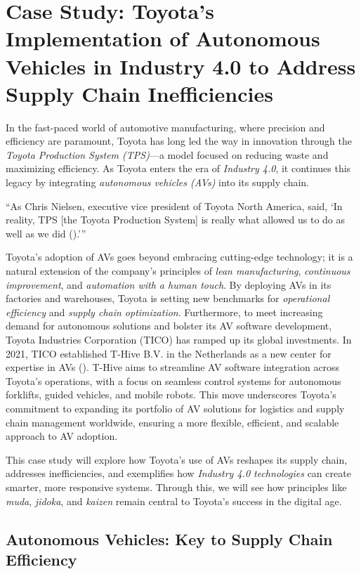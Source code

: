 \section{Case Study: Toyota’s Implementation of Autonomous Vehicles in Industry 4.0 to Address Supply Chain Inefficiencies}

In the fast-paced world of automotive manufacturing, where precision and efficiency are paramount, Toyota has long led the way in innovation through the \textit{Toyota Production System (TPS)}—a model focused on reducing waste and maximizing efficiency. As Toyota enters the era of \textit{Industry 4.0}, it continues this legacy by integrating \textit{autonomous vehicles (AVs)} into its supply chain. 

“As Chris Nielsen, executive vice president of Toyota North America, said, ‘In reality, TPS [the Toyota Production System] is really what allowed us to do as well as we did (\cite{Shih_2022}).’”

Toyota’s adoption of AVs goes beyond embracing cutting-edge technology; it is a natural extension of the company’s principles of \textit{lean manufacturing}, \textit{continuous improvement}, and \textit{automation with a human touch}. By deploying AVs in its factories and warehouses, Toyota is setting new benchmarks for \textit{operational efficiency} and \textit{supply chain optimization}. Furthermore, to meet increasing demand for autonomous solutions and bolster its AV software development, Toyota Industries Corporation (TICO) has ramped up its global investments. In 2021, TICO established T-Hive B.V. in the Netherlands as a new center for expertise in AVs (\cite{toyota_2021}). T-Hive aims to streamline AV software integration across Toyota’s operations, with a focus on seamless control systems for autonomous forklifts, guided vehicles, and mobile robots. This move underscores Toyota’s commitment to expanding its portfolio of AV solutions for logistics and supply chain management worldwide, ensuring a more flexible, efficient, and scalable approach to AV adoption.

This case study will explore how Toyota’s use of AVs reshapes its supply chain, addresses inefficiencies, and exemplifies how \textit{Industry 4.0 technologies} can create smarter, more responsive systems. Through this, we will see how principles like \textit{muda}, \textit{jidoka}, and \textit{kaizen} remain central to Toyota’s success in the digital age.

\subsection{Autonomous Vehicles: Key to Supply Chain Efficiency}

